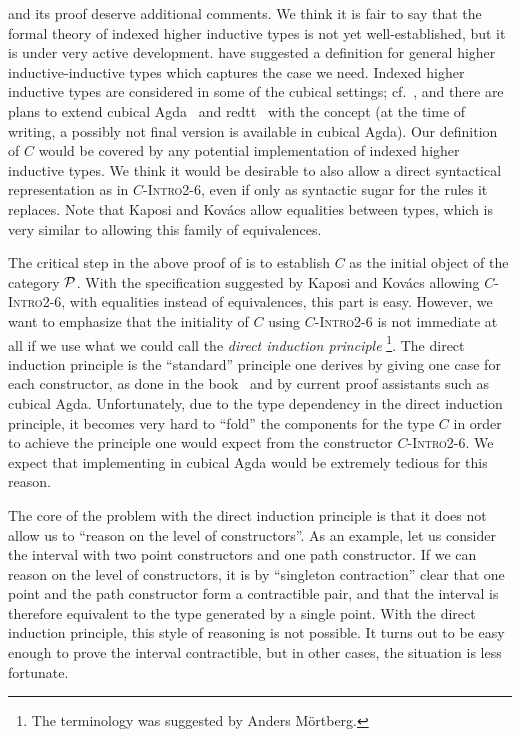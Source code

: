 \begin{remark} \label{rmk:paths-generalized-squid}
 and its proof 
deserve additional comments.
We think it is fair to say that the formal theory of indexed higher inductive
types is not yet well-established, but it is under very active development.
\citet{kaposi_et_al:LIPIcs:2018:9190,AAhiits} have
suggested a definition for general higher inductive-inductive types which captures
the case we need.
Indexed higher inductive types are considered in some of the cubical settings;
cf.\ \citet{cavallo2019higher}, and there are plans to extend
cubical Agda~\citep{andrea:cubicalagda,anders:cubicalblog,andreaAnders:experiments}
and redtt~\citep{redtt} with the concept (at the time of writing, a possibly not
final version is available in cubical Agda).
Our definition of $C$ would be covered by any potential implementation of
indexed higher inductive types.
We think it would be desirable to also allow a direct syntactical representation as
in
\textsc{$C$-Intro2-6}, even if only as syntactic sugar
for the rules it replaces.
Note that Kaposi and Kov{\'a}cs allow equalities between types,
which is very similar to allowing this family of equivalences.

The critical step in the above proof of  is to establish
$C$ as the initial object of the
category $\mathcal P$.
With the specification suggested by Kaposi and Kov{\'a}cs allowing
\textsc{$C$-Intro2-6}, with equalities instead of
equivalences, this part is easy.
However, we want to emphasize that the initiality of
$C$ using \textsc{$C$-Intro2-6}
is not immediate at all if we use what we could call the
\emph{direct induction principle}
\footnote{The terminology was suggested by Anders M\"ortberg.}.
The direct induction principle is the ``standard'' principle one derives by
giving one case for each constructor, as done in the book~
and by current proof assistants such as cubical Agda.
Unfortunately, due to the type dependency in the direct induction principle,
it becomes very hard to ``fold'' the components for the type
$C$ in order to achieve the principle one
would expect from the constructor \textsc{$C$-Intro2-6}.
We expect that implementing  in cubical Agda would be
extremely tedious for this reason.

The core of the problem with the direct induction principle is that it does not
allow us to ``reason on the level of constructors''.
As an example, let us consider the interval with two point constructors and one
path constructor.
If we can reason on the level of constructors, it is by ``singleton contraction''
clear that one point and the path constructor form a contractible pair, and that
the interval is therefore equivalent to the type generated by a single point.
With the direct induction principle, this style of reasoning is not possible.
It turns out to be easy enough to prove the interval contractible, but  in other
cases, the situation is less fortunate.


\end{remark}
